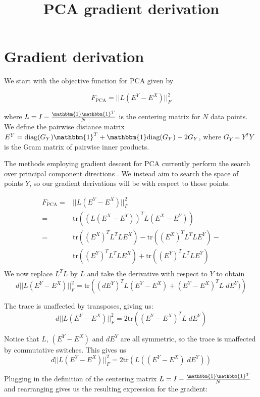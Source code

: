\documentclass{article}
\title{PCA gradient derivation}
\theoremstyle{definition}
\begin{document}
\maketitle
\section{Gradient derivation}

We start with the objective function for PCA given by

\[ F_{\text{PCA}} = ||L (E^Y - E^X) ||_F^2 \]

where $L = I - \frac{\mathbbm{1} \mathbbm{1}^T}{N}$ is the centering matrix for $N$ data points. We define the pairwise distance matrix $E^Y
= \text{diag}(G_Y) \mathbbm{1}^T + \mathbbm{1} \text{diag}(G_Y) - 2G_Y$, where $G_Y = Y^TY$ is the Gram matrix of pairwise inner products.


The methods employing gradient descent for PCA currently perform the search over principal component directions \cite{shamir2016convergence}. We instead aim to
search the space of points $Y$, so our gradient derivations will be with respect to those points.

\begin{align*}
    F_{\text{PCA}} = &||L (E^Y - E^X) ||_F^2 \\
    = &\text{tr}\left( (L(E^X - E^Y))^T L (E^X - E^Y) \right) \\
    = &\text{tr}\left( (E^X)^T L^T L E^X \right) - \text{tr}\left( (E^X)^T L^T L E^Y \right) - \\
    &\text{tr}\left( (E^Y)^T L^T L E^X \right) + \text{tr}\left( (E^Y)^T L^T L E^Y \right) \\ 
\end{align*}
We now replace $L^TL$ by $L$ and take the derivative with respect to $Y$ to obtain
\[ d ||L (E^Y - E^X) ||_F^2  = \text{tr}\left( (d E^Y)^T L(E^Y - E^X) + (E^Y - E^X)^T L \; d E^Y) \right) \]

The trace is unaffected by transposes, giving us:
\[ d ||L (E^Y - E^X) ||_F^2  = 2 \text{tr}\left( (E^Y - E^X)^T L \; dE^Y \right)\]

Notice that $L$, $(E^Y - E^X)$ and $dE^Y$ are all symmetric, so the trace is unaffected by commutative switches. This gives us
\[ d ||L (E^Y - E^X) ||_F^2  = 2 \text{tr}\left( L \left( (E^Y - E^X) \; dE^Y \right) \right)\]

Plugging in the definition of the centering matrix $L = I - \frac{\mathbbm{1} \mathbbm{1}^T}{N}$ and rearranging gives us the resulting expression for the
gradient:
\end{document}

